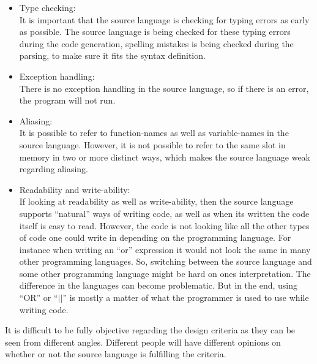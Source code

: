 \begin{itemize}
\item Type checking: \\
It is important that the source language is checking for typing errors as early as possible. The source language is being checked for these typing errors during the code generation, spelling mistakes is being checked during the parsing, to make sure it fits the syntax definition. 
\item Exception handling: \\
There is no exception handling in the source language, so if there is an error, the program will not run. 
\item Aliasing: \\
It is possible to refer to function-names as well as variable-names in the source language. However, it is not possible to refer to the same slot in memory in two or more distinct ways, which makes the source language weak regarding aliasing. 
\item Readability and write-ability:  \\
If looking at readability as well as write-ability, then the source language supports ``natural'' ways of writing code, as well as when its written the code itself is easy to read. However, the code is not looking like all the other types of code one could write in depending on the programming language. For instance when writing an ``or'' expression it would not look the same in many other programming languages. So, switching between the source language and some other programming language might be hard on ones interpretation. The difference in the languages can become problematic. But in the end, using ``OR'' or ``$||$'' is mostly a matter of what the programmer is used to use while writing code. 
\end{itemize}
It is difficult to be fully objective regarding the design criteria as they can be seen from different angles. Different people will have different opinions on whether or not the source language is fulfilling the criteria. 